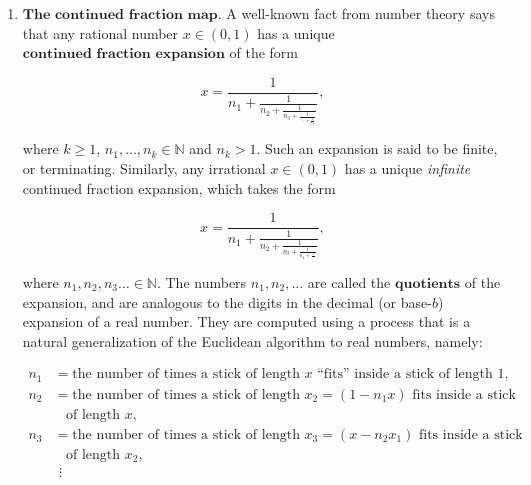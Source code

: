 \documentclass[11pt]{report}
\newcommand{\N}{\mathbb{N}}
\theoremstyle{plain}
\newtheorem{lem}[thm]{Lemma}
\theoremstyle{definition}
\begin{document}
\begin{enumerate}[label=\arabic*.]
\[
D(x) = 2x\textrm{ mod }1 = \begin{cases} 2x&x<\tfrac12, \\ 2x-1&x\ge\tfrac12. \end{cases}
\]

\begin{lem}
$D$ preserves Lebesgue measure.
\end{lem}

\begin{proof}
If $A\subset [0,1]$ is a Borel set, then

\[
\operatorname{Leb}(D^{-1}(A)) =
\operatorname{Leb}\left(\tfrac12 A \sqcup \left(\tfrac12 A+\tfrac12\right) \right)
= \tfrac12 \operatorname{Leb}(A)
+ \tfrac12 \operatorname{Leb}(\tfrac12+A) =
\operatorname{Leb}(A).
\]

\end{proof}

\noindent We have seen before that the measure space $[0,1]$
with Lebesgue measure is isomorphic to the product
space of an infinite sequence of i.i.d.\ unbiased coin
tosses. It is easy to see that under this isomorphism,
the doubling map translates to the shift map $S$ of
the Bernoulli sequence. So, the doubling map is really
a disguised version of the Bernoulli shift associated
with i.i.d.\ unbiased coin tosses.

\item $\textbf{The continued fraction map.}$ A well-known
fact from number theory says that any rational number
$x\in (0,1)$ has a unique
$\textbf{continued fraction expansion}$ of the form

\[
x = \frac{1}{n_1+\frac{1}{n_2+\frac{1}{n_3+\frac{1}{\ddots+\frac{1}{n_k}}}}},
\]

\noindent where $k\ge 1$, $n_1,\ldots,n_k\in \N$ and $n_k>1$.
Such an expansion is said to be finite, or
terminating. Similarly, any irrational $x\in(0,1)$
has a unique \emph{infinite} continued fraction expansion,
which takes the form

\[
x = \frac{1}{n_1+\frac{1}{n_2+\frac{1}{n_3+\frac{1}{n_4+\frac{1}{\ldots}}}}},
\]

\noindent where $n_1,n_2,n_3\ldots \in \N$. The numbers
$n_1,n_2,\ldots$ are called the $\textbf{quotients}$
of the expansion, and are analogous to the digits in
the decimal (or base-$b$) expansion of a real number.
They are computed using a process that is a natural
generalization of the Euclidean algorithm to real
numbers, namely:

\begin{align*}
n_1 &= \textrm{the number of times a stick of length $x$ ``fits'' inside a stick of length $1$}, \\
n_2 &= \textrm{the number of times a stick of length $x_2=(1-n_1x)$ fits inside a stick}\\ &\ \ \ \ \textrm{of length $x$},
\\
n_3 &= \textrm{the number of times a stick of length $x_3=(x-n_2x_1)$ fits inside a stick} \\
&\ \ \ \ \textrm{of length $x_2$}, \\
& \ \,\vdots
\end{align*}


\end{enumerate}
\end{document}
